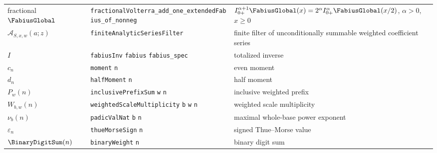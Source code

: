 \documentclass[11pt,oneside]{article}
\theoremstyle{definition}
\theoremstyle{remark}
\newcommand{\lean}[1]{%
  \ifmmode\text{\nolinkurl{#1}}\else\nolinkurl{#1}\fi}
\begin{document}
\begin{longtable}{@{}
  >{\raggedright\arraybackslash}p{}
  >{\raggedright\arraybackslash}p{}
  >{\raggedright\arraybackslash}p{}@{}}
fractional \(\FabiusGlobal\) & \lean{fractionalVolterra_add_one_extendedFabius_of_nonneg} & \(I_{0+}^{\alpha+1}\FabiusGlobal(x)=2^\alpha I_{0+}^{\alpha}\FabiusGlobal(x/2)\), \(\alpha>0\), \(x\ge0\)\\
\(\mathcal A_{S,x,w}(a;z)\) & \lean{finiteAnalyticSeriesFilter} & finite filter of unconditionally summable weighted coefficient series\\
\(I\) & \lean{fabiusInv}\hspace{0.35em}\lean{fabius}\hspace{0.35em}\lean{fabius_spec} & totalized inverse\\
\(c_n\) & \lean{moment}\hspace{0.35em}\lean{n} & even moment\\
\(d_n\) & \lean{halfMoment}\hspace{0.35em}\lean{n} & half moment\\
\(P_w(n)\) & \lean{inclusivePrefixSum}\hspace{0.35em}\lean{w}\hspace{0.35em}\lean{n} & inclusive weighted prefix\\
\(W_{b,w}(n)\) & \lean{weightedScaleMultiplicity}\hspace{0.35em}\lean{b}\hspace{0.35em}\lean{w}\hspace{0.35em}\lean{n} & weighted scale multiplicity\\
\(\nu_b(n)\) & \lean{padicValNat}\hspace{0.35em}\lean{b}\hspace{0.35em}\lean{n} & maximal whole-base power exponent\\
\(\varepsilon_n\) & \lean{thueMorseSign}\hspace{0.35em}\lean{n} & signed Thue--Morse value\\
\(\BinaryDigitSum(n)\) & \lean{binaryWeight}\hspace{0.35em}\lean{n} & binary digit sum\\
\bottomrule
\end{longtable}
\end{document}
